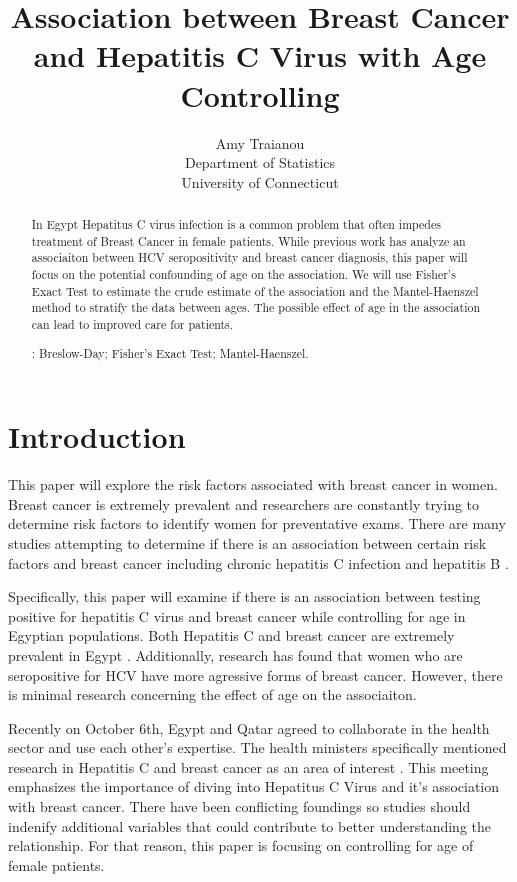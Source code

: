 \documentclass[12pt, titlepage]{article}
\title{Association between Breast Cancer and Hepatitis C Virus with Age Controlling}
\author{Amy Traianou\\
  Department of Statistics\\
  University of Connecticut
}
\begin{document}
\maketitle


\begin{abstract}
In Egypt Hepatitus C virus infection is a common problem that often impedes treatment
of Breast Cancer in female patients. While previous work has analyze an associaiton 
between HCV seropositivity and breast cancer diagnosis, this paper will focus on the 
potential confounding of age on the association. We will use Fisher's Exact Test to
estimate the crude estimate of the association and the Mantel-Haenszel method to 
stratify the data between ages. The possible effect of age in the association can
lead to improved care for patients. 


\bigskip
{}:
Breslow-Day;
Fisher's Exact Test;
Mantel-Haenszel.
\end{abstract}


\section{Introduction}
\label{sec:intro}

This paper will explore the risk factors associated with breast 
cancer in women. Breast cancer is extremely prevalent and researchers 
are constantly trying to determine risk factors to identify women for preventative exams.
There are many studies attempting to determine if there is an association 
between certain risk factors and breast cancer including chronic hepatitis 
C infection \citep{Larrey2010is} and hepatitis B \citep{vishnu2016does}. 

Specifically, this paper will examine if there is an association between 
testing positive for hepatitis C virus and breast cancer while controlling 
for age in Egyptian populations. Both Hepatitis C and breast 
cancer are extremely prevalent in Egypt \citep{Hussein2021high}.
Additionally, research has found that women who are seropositive for 
HCV have more agressive forms of breast cancer. However, there is 
minimal research concerning the effect of age on the associaiton. 

Recently on October 6th, Egypt and Qatar agreed to collaborate in the health sector and 
use each other's expertise. The health ministers specifically mentioned research 
in Hepatitis C and breast cancer as an area of interest \citep{arham2022egypt}. 
This meeting emphasizes the importance of diving into Hepatitus C Virus 
and it's association with breast cancer. There have been conflicting
foundings so studies should indenify additional variables that could 
contribute to better understanding the relationship. For that reason,
this paper is focusing on controlling for age of female patients. 
\end{document}

